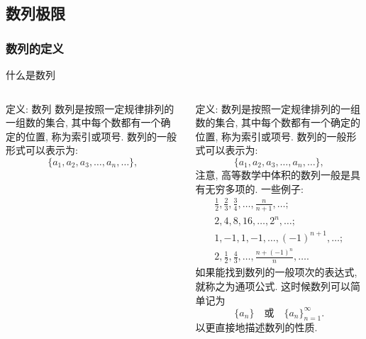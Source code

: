 \documentclass[
10pt, 
aspectratio=43, 
]{beamer}
\begin{document}
\subsection{数列极限}
\subsubsection{数列的定义}
\begin{frame}{什么是数列}
	\begin{columns}
		\begin{block}{定义: 数列}
			数列是按照一定规律排列的一组数的集合, 其中每个数都有一个确定的位置, 称为索引或项号. 数列的一般形式可以表示为: 
			\begin{equation*}
				\{ a_1,  a_2,  a_3,  \ldots,  a_n,  \ldots \}, 
			\end{equation*}
		\end{block}
		定义: 数列是按照一定规律排列的一组数的集合, 其中每个数都有一个确定的位置, 称为索引或项号. 数列的一般形式可以表示为: 
		\begin{equation*}
			\{ a_1,  a_2,  a_3,  \ldots,  a_n,  \ldots \}, 
		\end{equation*}
		注意, 高等数学中体积的数列一般是具有无穷多项的. 
		\small
		一些例子: 
		\begin{equation*}
			\begin{array}{l}
				{\displaystyle\frac12, \frac23, \frac34, \ldots, \frac{n}{n+1}, \ldots;} \\
				{\displaystyle2, 4, 8, 16, \ldots, 2^n, \ldots;}                         \\
				{\displaystyle1, -1, 1, -1, \ldots, (-1)^{n+1}, \ldots;}                 \\
				{\displaystyle2, \frac12, \frac43, \ldots, \frac{n+(-1)^n}{n}, \ldots.}  
			\end{array}
		\end{equation*}
		如果能找到数列的一般项次的表达式, 就称之为通项公式. 这时候数列可以简单记为
		\begin{equation*}
			\{a_n\}\quad \text{或}\quad \{a_n\}_{n=1}^\infty.
		\end{equation*}
		以更直接地描述数列的性质. 
	\end{columns}
\end{frame}
\end{document}
